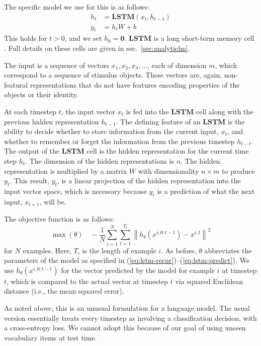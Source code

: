 \documentclass{article}
\newcommand{\secref}[1]{sec.~\ref{#1}}
\newcommand{\eg}[1]{(\ref{#1})}
\newcommand{\dasheg}[2]{\eg{#1}--\eg{#2}}
\newcommand{\update}[1]{{\color{darkblue}#1}}
\newcommand{\LSTM}{\textbf{LSTM}}
\begin{document}
The specific model we use for this is as follows:
%
\begin{align}
  h_{t} &= \LSTM(x_{t}, h_{t-1}) \label{eq:lstm-recur}\\
  y_{t} &= h_{t}W + b\label{eq:lstm-predict}
\end{align}
%
This holds for $t > 0$, and we set $h_{0} = \mathbf{0}$. $\LSTM$ is a long short-term memory cell \citep{hochreiter:1997}. Full details on these cells are given in \secref{sec:analyticlm}.

The input is a sequence of vectors $x_1, x_2, x_3, \dots$, each of dimension $m$, which correspond to a sequence of stimulus objects.  These vectors are, again, non-featural representations that do not have features encoding properties of the objects or their identity.


At each timestep $t$, the input vector $x_t$ is fed into the $\LSTM$ cell along with the previous hidden representation $h_{t-1}$. The defining feature of an $\LSTM$ is the ability to decide whether to store information from the current input, $x_t$, and whether to remember or forget the information from the previous timestep $h_{t-t}$. The output of the $\LSTM$ cell is the hidden representation for the current time step $h_t$. The dimension of the hidden representations is $n$. The hidden representation is multiplied by a matrix $W$ with dimensionality $n \times m$ to produce $y_t$. This result, $y_t$, is a linear projection of the hidden representation into the input vector space, which is necessary because $y_t$ is a prediction of what the next input, $x_{t+1}$, will be.

\update{
  The objective function is as follows:
%
\begin{equation}
  \max(\theta)
  \quad
  -\frac{1}{N}
  \sum_{i=1}^{N}
  \sum_{t=1}^{T_{i}}
  \left\| h_{\theta}\left(x^{i, 0:{t-1}}\right) - x^{i,t} \right\|^{2}
\end{equation}
%
for $N$ examples. Here, $T_{i}$ is the length of example $i$. As before, $\theta$ abbreviates the parameters of the model as specified in \dasheg{eq:lstm-recur}{eq:lstm-predict}. We use $h_{\theta}(x^{i, 0:{t-1}})$ for the vector predicted by the model for example $i$ at timestep $t$, which is compared to the actual vector at timestep $t$ via squared Euclidean distance (i.e., the mean squared error).

As noted above, this is an unusual formulation for a language model. The usual version essentially treats every timestep as involving a classification decision, with a cross-entropy loss. We cannot adopt this because of our goal of using unseen vocabulary items at test time.}
\end{document}
